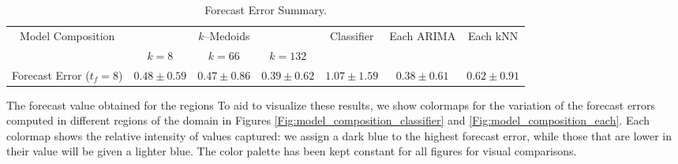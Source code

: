 \begin{table}[h!]
	\centering
	\tiny
	\begin{tabular}{|c|c|c|c|c|c|c|}
		\hline
		\multirow{2}{*}{Model Composition} & \multicolumn{3}{c|}{$k$--Medoids} & \multirow{2}{*}{Classifier} & \multirow{2}{*}{Each ARIMA} & \multirow{2}{*}{Each kNN} \\
		\cline{2-4}
		& $k = 8$ & $k = 66$ & $k = 132$  \\
		\cline{2-4}
		\hline
		Forecast Error ($t_{f}=8$) & $0.48 \pm 0.59$ & $0.47 \pm 0.86$ & $0.39 \pm 0.62$ & $1.07 \pm 1.59$ & $0.38 \pm 0.61$ & $0.62 \pm 0.91$\\
		\hline
	\end{tabular}
	\caption{Forecast Error Summary.}
	\label{Table:Query10x10_Classfier_Point_Each_StatSummary}
\end{table}

The forecast value obtained for the regions 
To aid to visualize these results, we show colormaps for the variation of the forecast errors computed in different regions of the domain in Figures \ref{Fig:model_composition_classifier} and \ref{Fig:model_composition_each}. Each colormap shows the relative intensity of values captured: we assign a dark blue to the highest forecast error, while those that are lower in their value will be given a lighter blue. The color palette has been kept constant for all figures for visual comparisons.

